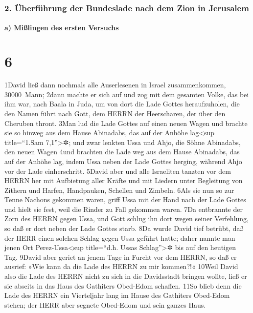\hypertarget{uxfcberfuxfchrung-der-bundeslade-nach-dem-zion-in-jerusalem}{%
\subsubsection{2. Überführung der Bundeslade nach dem Zion in
Jerusalem}\label{uxfcberfuxfchrung-der-bundeslade-nach-dem-zion-in-jerusalem}}

\hypertarget{a-miuxdflingen-des-ersten-versuchs}{%
\paragraph{a) Mißlingen des ersten
Versuchs}\label{a-miuxdflingen-des-ersten-versuchs}}

\hypertarget{section-5}{%
\section{6}\label{section-5}}

1David ließ dann nochmals alle Auserlesenen in Israel zusammenkommen,
30000~Mann; 2dann machte er sich auf und zog mit dem gesamten Volke, das
bei ihm war, nach Baala in Juda, um von dort die Lade Gottes
heraufzuholen, die den Namen führt nach Gott, dem HERRN der Heerscharen,
der über den Cheruben thront. 3Man lud die Lade Gottes auf einen neuen
Wagen und brachte sie so hinweg aus dem Hause Abinadabs, das auf der
Anhöhe lag\textless sup title=``1.Sam 7,1''\textgreater✲; und zwar
lenkten Ussa und Ahjo, die Söhne Abinadabs, den neuen Wagen 4und
brachten die Lade weg aus dem Hause Abinadabs, das auf der Anhöhe lag,
indem Ussa neben der Lade Gottes herging, während Ahjo vor der Lade
einherschritt. 5David aber und alle Israeliten tanzten vor dem HERRN her
mit Aufbietung aller Kräfte und mit Liedern unter Begleitung von Zithern
und Harfen, Handpauken, Schellen und Zimbeln. 6Als sie nun so zur Tenne
Nachons gekommen waren, griff Ussa mit der Hand nach der Lade Gottes und
hielt sie fest, weil die Rinder zu Fall gekommen waren. 7Da entbrannte
der Zorn des HERRN gegen Ussa, und Gott schlug ihn dort wegen seiner
Verfehlung, so daß er dort neben der Lade Gottes starb. 8Da wurde David
tief betrübt, daß der HERR einen solchen Schlag gegen Ussa geführt
hatte; daher nannte man jenen Ort Perez-Ussa\textless sup title=``d.h.
Ussas Schlag''\textgreater✲ bis auf den heutigen Tag. 9David aber geriet
an jenem Tage in Furcht vor dem HERRN, so daß er ausrief: »Wie kann da
die Lade des HERRN zu mir kommen?!« 10Weil David also die Lade des HERRN
nicht zu sich in die Davidsstadt bringen wollte, ließ er sie abseits in
das Haus des Gathiters Obed-Edom schaffen. 11So blieb denn die Lade des
HERRN ein Vierteljahr lang im Hause des Gathiters Obed-Edom stehen; der
HERR aber segnete Obed-Edom und sein ganzes Haus.

